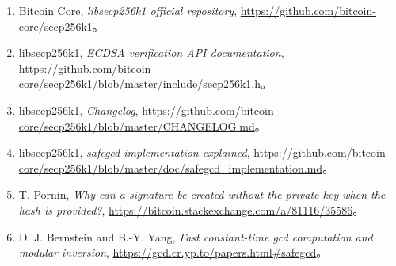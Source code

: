 \documentclass[UTF8,a4paper,12pt]{ctexart}
\begin{document}
\begin{enumerate}
  \item Bitcoin Core, \emph{libsecp256k1 official repository},
  \url{https://github.com/bitcoin-core/secp256k1}。
  \item libsecp256k1, \emph{ECDSA verification API documentation},
  \url{https://github.com/bitcoin-core/secp256k1/blob/master/include/secp256k1.h}。
  \item libsecp256k1, \emph{Changelog},
  \url{https://github.com/bitcoin-core/secp256k1/blob/master/CHANGELOG.md}。
  \item libsecp256k1, \emph{safegcd implementation explained},
  \url{https://github.com/bitcoin-core/secp256k1/blob/master/doc/safegcd_implementation.md}。
  \item T. Pornin, \emph{Why can a signature be created without the private key when the hash is provided?},
  \url{https://bitcoin.stackexchange.com/a/81116/35586}。
  \item D. J. Bernstein and B.-Y. Yang, \emph{Fast constant-time gcd computation and modular inversion},
  \url{https://gcd.cr.yp.to/papers.html#safegcd}。
\end{enumerate}
\end{document}
